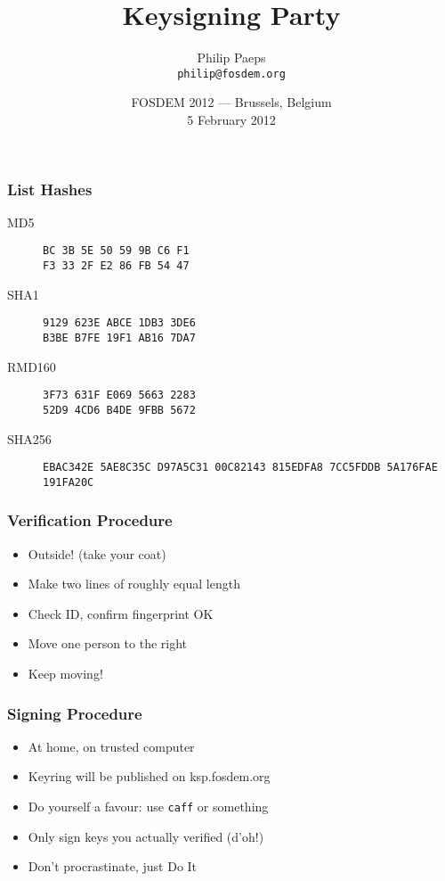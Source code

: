 \documentclass{beamer}
\title{Keysigning Party}
\author[Philip Paeps]{Philip Paeps \\ {\tt philip@fosdem.org}}
\date[FOSDEM 2012]{FOSDEM 2012 --- Brussels, Belgium \\ 5 February 2012}
\begin{document}
\begin{frame}[plain]
    \titlepage
    \begin{center}
    \end{center}
\end{frame}

\begin{frame}
    \frametitle{List Hashes}

    \begin{description}
    \item[MD5]
    { \tt BC 3B 5E 50 59 9B C6 F1 \\ F3 33 2F E2 86 FB 54 47 }
    \item[SHA1]
    { \tt 9129 623E ABCE 1DB3 3DE6 \\ B3BE B7FE 19F1 AB16 7DA7 }
    \item[RMD160]
    {\tt 3F73 631F E069 5663 2283 \\ 52D9 4CD6 B4DE 9FBB 5672}
    \item[SHA256]
    {\tt  EBAC342E 5AE8C35C D97A5C31 00C82143 815EDFA8 7CC5FDDB 5A176FAE 191FA20C}
    \end{description}
\end{frame}

\begin{frame}
    \frametitle{Verification Procedure}

    \begin{itemize}
    \item Outside! (take your coat)
    \item Make two lines of roughly equal length
    \item Check ID, confirm fingerprint OK
    \item Move one person to the right
    \item Keep moving!
    \end{itemize}
\end{frame}

\begin{frame}
    \frametitle{Signing Procedure}

    \begin{itemize}
    \item At home, on trusted computer
    \item Keyring will be published on ksp.fosdem.org
    \item Do yourself a favour: use {\tt caff} or something
    \item Only sign keys you actually verified (d'oh!)
    \item Don't procrastinate, just Do It\texttrademark
    \end{itemize}
\end{frame}
\end{document}
